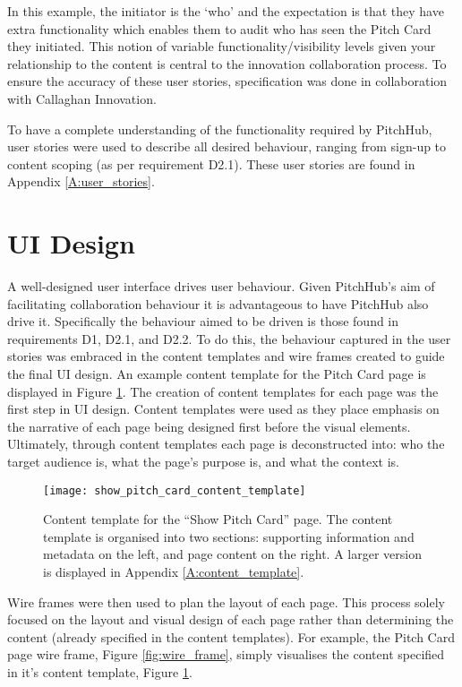 In this example, the initiator is the `who' and the expectation is that they have extra functionality which enables them to audit who has seen the Pitch Card they initiated. This notion of variable functionality/visibility levels given your relationship to the content is central to the innovation collaboration process. To ensure the accuracy of these user stories, specification was done in collaboration with Callaghan Innovation. 

To have a complete understanding of the functionality required by PitchHub, user stories were used to describe all desired behaviour, ranging from sign-up to content scoping (as per requirement D2.1). These user stories are found in Appendix \ref{A:user_stories}.


\section{UI Design}
A well-designed user interface drives user behaviour. Given PitchHub's aim of facilitating collaboration behaviour it is advantageous to have PitchHub also drive it. Specifically the behaviour aimed to be driven is those found in requirements D1, D2.1, and D2.2. To do this, the behaviour captured in the user stories was embraced in the content templates and wire frames created to guide the final UI design. An example content template for the Pitch Card page is displayed in Figure \ref{fig:content_template}.
The creation of content templates for each page was the first step in UI design. Content templates were used as they place emphasis on the narrative of each page being designed first before the visual elements. Ultimately, through content templates each page is deconstructed into: who the target audience is, what the page's purpose is, and what the context is.

\begin{figure}[ht]
    \centering
    \texttt{[image: show\_pitch\_card\_content\_template]}
    \caption{Content template for the ``Show Pitch Card'' page. The content template is organised into two sections: supporting information and metadata on the left, and page content on the right. A larger version is displayed in Appendix \ref{A:content_template}.}
    \label{fig:content_template}
\end{figure}

Wire frames were then used to plan the layout of each page. This process solely focused on the layout and visual design of each page rather than determining the content (already specified in the content templates). For example, the Pitch Card page wire frame, Figure \ref{fig:wire_frame}, simply visualises the content specified in it's content template, Figure \ref{fig:content_template}.

